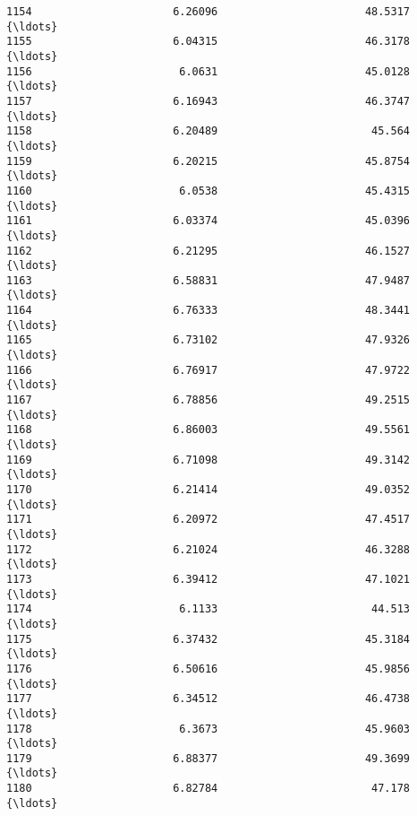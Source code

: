 \documentclass[11pt]{article}
\begin{document}
\begin{tcolorbox}[breakable, size=fbox, boxrule=.5pt, pad at break*=1mm, opacityfill=0]
\begin{Verbatim}[commandchars=\\\{\}]
1154                      6.26096                       48.5317  {\ldots}
1155                      6.04315                       46.3178  {\ldots}
1156                       6.0631                       45.0128  {\ldots}
1157                      6.16943                       46.3747  {\ldots}
1158                      6.20489                        45.564  {\ldots}
1159                      6.20215                       45.8754  {\ldots}
1160                       6.0538                       45.4315  {\ldots}
1161                      6.03374                       45.0396  {\ldots}
1162                      6.21295                       46.1527  {\ldots}
1163                      6.58831                       47.9487  {\ldots}
1164                      6.76333                       48.3441  {\ldots}
1165                      6.73102                       47.9326  {\ldots}
1166                      6.76917                       47.9722  {\ldots}
1167                      6.78856                       49.2515  {\ldots}
1168                      6.86003                       49.5561  {\ldots}
1169                      6.71098                       49.3142  {\ldots}
1170                      6.21414                       49.0352  {\ldots}
1171                      6.20972                       47.4517  {\ldots}
1172                      6.21024                       46.3288  {\ldots}
1173                      6.39412                       47.1021  {\ldots}
1174                       6.1133                        44.513  {\ldots}
1175                      6.37432                       45.3184  {\ldots}
1176                      6.50616                       45.9856  {\ldots}
1177                      6.34512                       46.4738  {\ldots}
1178                       6.3673                       45.9603  {\ldots}
1179                      6.88377                       49.3699  {\ldots}
1180                      6.82784                        47.178  {\ldots}


\end{Verbatim}
\end{tcolorbox}
\end{document}
